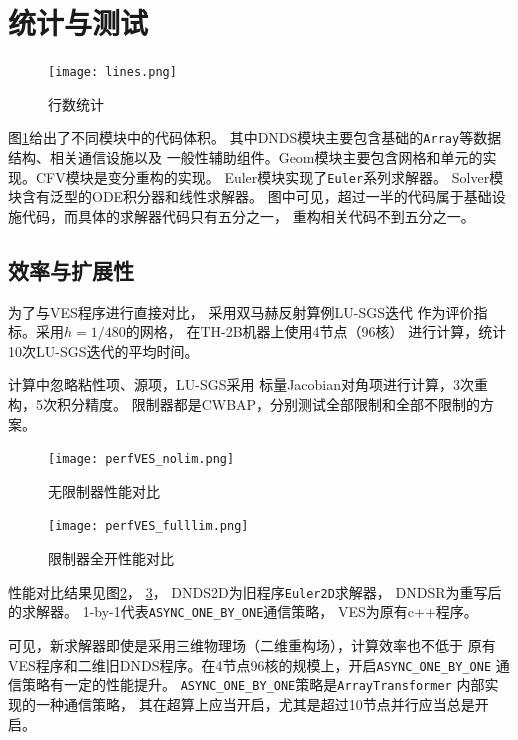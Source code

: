 \documentclass[UTF8,zihao=5]{ctexart} %
\begin{document}
\section{统计与测试}

\begin{figure}[htbp]
    \centering
    \texttt{[image: lines.png]}  %
    \caption{行数统计
        }
    \label{fig:lines}
\end{figure}

图\ref{fig:lines}给出了不同模块中的代码体积。
其中DNDS模块主要包含基础的\verb|Array|等数据结构、相关通信设施以及
一般性辅助组件。Geom模块主要包含网格和单元的实现。CFV模块是变分重构的实现。
Euler模块实现了\verb|Euler|系列求解器。
Solver模块含有泛型的ODE积分器和线性求解器。
图中可见，超过一半的代码属于基础设施代码，而具体的求解器代码只有五分之一，
重构相关代码不到五分之一。

\subsection{效率与扩展性}
为了与VES程序进行直接对比，
采用双马赫反射算例LU-SGS迭代
作为评价指标。采用$h=1/480$的网格，
在TH-2B机器上使用4节点（96核）
进行计算，统计10次LU-SGS迭代的平均时间。

计算中忽略粘性项、源项，LU-SGS采用
标量Jacobian对角项进行计算，3次重构，5次积分精度。
限制器都是CWBAP，分别测试全部限制和全部不限制的方案。

\begin{figure}[htbp]
    \centering
    \texttt{[image: perfVES\_nolim.png]}  %
    \caption{无限制器性能对比}
    \label{fig:perfVES_nolim}
\end{figure}

\begin{figure}[htbp]
    \centering
    \texttt{[image: perfVES\_fulllim.png]}  %
    \caption{限制器全开性能对比}
    \label{fig:perfVES_fulllim}
\end{figure}

性能对比结果见图\ref{fig:perfVES_nolim}，
\ref{fig:perfVES_fulllim}，
DNDS2D为旧程序\verb|Euler2D|求解器，
DNDSR为重写后的求解器。
1-by-1代表\verb|ASYNC_ONE_BY_ONE|通信策略，
VES为原有c++程序。

可见，新求解器即使是采用三维物理场（二维重构场），计算效率也不低于
原有VES程序和二维旧DNDS程序。在4节点96核的规模上，开启\verb|ASYNC_ONE_BY_ONE|
通信策略有一定的性能提升。
\verb|ASYNC_ONE_BY_ONE|策略是\verb|ArrayTransformer|
内部实现的一种通信策略，
其在超算上应当开启，尤其是超过10节点并行应当总是开启。
\end{document}

